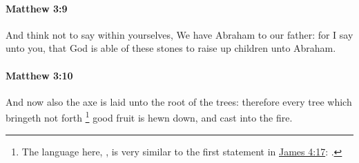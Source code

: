 		\paragraph{Matthew 3:9} %
			\label{MATTHEW-3-9}

			And think not to say within yourselves, We have Abraham to our father: for I say unto you, that God is able of these stones to raise up children unto Abraham.

			\begin{framed}
			\scriptsize
				\begin{compactdesc}
					\item[SBLG] 
				\end{compactdesc}
			\end{framed}

		\paragraph{Matthew 3:10} %
			\label{MATTHEW-3-10}

			And now also the axe is laid unto the root of the trees: therefore every tree which bringeth not forth%
				\footnote{%
					The language here, , is very similar to the first statement in \hyperref[JAMES-4-17]{James 4:17}: .
					}
			good fruit is hewn down, and cast into the fire.

